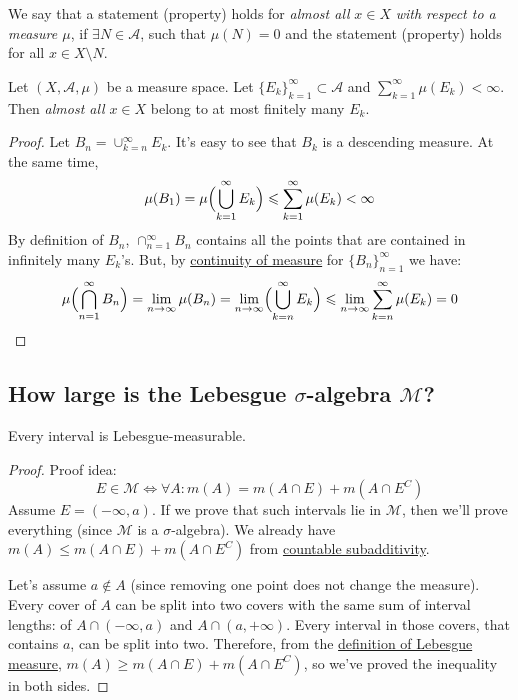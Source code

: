 \begin{definition}
    We say that a statement (property) holds for \textit{almost all} $x \in X$
    \textit{with respect to a measure $\mu$}, if
    $\exists N \in \mathcal{A}$, such that $\mu(N) = 0$ and the statement (property)
    holds for all $x \in X \setminus N$.
\end{definition}
\begin{lemma}
    \label{lem:borCantelly}
    Let $(X, \mathcal{A}, \mu)$ be a measure space. Let
    $\{E_k\}_{k=1}^\infty \subset \mathcal{A}$ and $\sum_{k=1}^\infty \mu(E_k) < \infty$.
    Then \textit{almost all} $x \in X$ belong to at most finitely many $E_k$.
\end{lemma}
\begin{proof}
    Let $B_n = \cup_{k=n}^\infty E_k$. It's easy to see that $B_k$ is a descending measure.
    At the same time,
    \[ \mu(B_1) = \mu\Bigl(\bigcup_{k=1}^\infty E_k\Bigr) \le \sum_{k=1}^\infty \mu(E_k) < \infty \]
    By definition of $B_n$, $\cap_{n=1}^\infty B_n$ contains all the points
    that are contained in infinitely many $E_k$'s. But, by \hyperref[the:continuityOfMeasure]{continuity of measure} 
    for $\{B_n\}_{n=1}^\infty$ we have:
    \[ 
        \mu\Bigl(\bigcap_{n=1}^\infty B_n\Bigr) =
        \lim_{n \to \infty} \mu(B_n) =
        \lim_{n \to \infty} \Bigl(\bigcup_{k=n}^\infty E_k\Bigr) \le
        \lim_{n \to \infty} \sum_{k=n}^\infty \mu(E_k) = 0
    \]
\end{proof}

\subsection{How large is the Lebesgue $\sigma$-algebra $\mathcal{M}$?}
\begin{proposition}
    \label{prop:intervalsAreMeasurable}
    Every interval is Lebesgue-measurable.
\end{proposition}
\begin{proof}
    Proof idea:
    \[ 
        E \in \mathcal{M} \Longleftrightarrow 
        \forall A: m(A) = m(A \cap E) + m(A \cap E^C)
    \]
    Assume $E = (-\infty, a)$. If we prove that such intervals lie in $\mathcal{M}$, 
    then we'll prove everything (since $\mathcal{M}$ is a $\sigma$-algebra).
    We already have $m(A) \le m(A \cap E) + m(A \cap E^C)$ from \hyperref[the:countableSubadditivity]{countable subadditivity}.

    Let's assume $a \not\in A$ (since removing one point does not change the measure).
    Every cover of $A$ can be split into two covers with the same sum of interval lengths: of
    $A \cap (-\infty, a)$ and $A \cap (a, +\infty)$. Every interval in those
    covers, that contains $a$, can be split into two. Therefore,
    from the \hyperref[def:lebesgueOuterMeasure]{definition of Lebesgue measure}, 
    $m(A) \ge m(A \cap E) + m(A \cap E^C)$, so we've proved the inequality in both sides.
\end{proof}